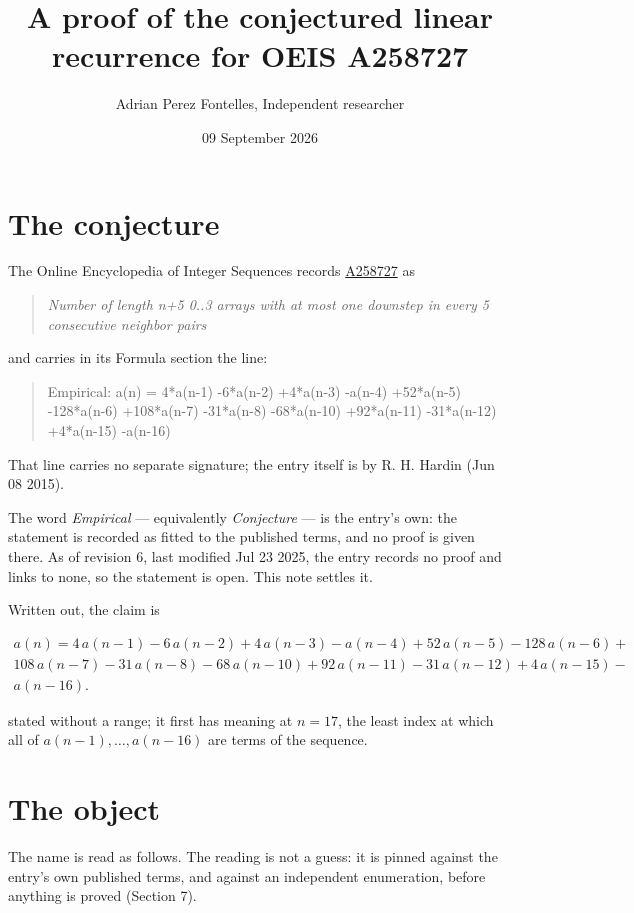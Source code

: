 \documentclass[11pt]{article}
\title{A proof of the conjectured linear recurrence for OEIS A258727}
\author{Adrian Perez Fontelles, Independent researcher}
\date{09 September 2026}
\theoremstyle{definition}
\begin{document}
\maketitle
\section{The conjecture}

The Online Encyclopedia of Integer Sequences records \href{https://oeis.org/A258727}{A258727} as

\begin{quote}\itshape Number of length n+5 0..3 arrays with at most one downstep in every 5 consecutive neighbor pairs\end{quote}

and carries in its Formula section the line:

\begin{quote}\ttfamily Empirical: a(n) = 4*a(n-1) -6*a(n-2) +4*a(n-3) -a(n-4) +52*a(n-5) -128*a(n-6) +108*a(n-7) -31*a(n-8) -68*a(n-10) +92*a(n-11) -31*a(n-12) +4*a(n-15) -a(n-16)\end{quote}

That line carries no separate signature; the entry itself is by R. H. Hardin (Jun 08 2015).

The word {\itshape Empirical} --- equivalently {\itshape Conjecture} --- is the entry's own: the statement is recorded as fitted to the published terms, and no proof is given there. As of revision 6, last modified Jul 23 2025, the entry records no proof and links to none, so the statement is open. This note settles it.

Written out, the claim is

\begin{multline*} a(n) = 4\,a(n-1) - 6\,a(n-2) + 4\,a(n-3) - a(n-4) + 52\,a(n-5) - 128\,a(n-6) + \\ 108\,a(n-7) - 31\,a(n-8) - 68\,a(n-10) + 92\,a(n-11) - 31\,a(n-12) + 4\,a(n-15) - \\ a(n-16). \end{multline*}

stated without a range; it first has meaning at $n = 17$, the least index at which all of $a(n-1),\dots,a(n-16)$ are terms of the sequence.

\section{The object}

The name is read as follows. The reading is not a guess: it is pinned against the entry's own published terms, and against an independent enumeration, before anything is proved (Section 7).
\end{document}
